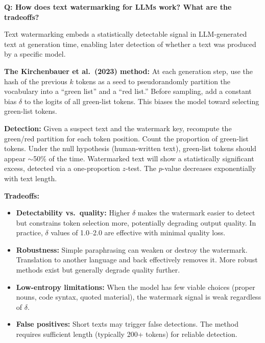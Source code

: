 \begin{interviewq}
\textbf{Q: How does text watermarking for LLMs work? What are the tradeoffs?}

 \quad {} \quad \badgefreq{\freqlow}

\stronganswer
Text watermarking embeds a statistically detectable signal in LLM-generated
text at generation time, enabling later detection of whether a text was
produced by a specific model.

\textbf{The Kirchenbauer et al.\ (2023) method:}  At each generation step,
use the hash of the previous $k$ tokens as a seed to pseudorandomly partition
the vocabulary into a ``green list'' and a ``red list.''  Before sampling,
add a constant bias $\delta$ to the logits of all green-list tokens.  This
biases the model toward selecting green-list tokens.

\textbf{Detection:}  Given a suspect text and the watermark key, recompute
the green/red partition for each token position.  Count the proportion of
green-list tokens.  Under the null hypothesis (human-written text), green-list
tokens should appear $\sim$50\% of the time.  Watermarked text will show a
statistically significant excess, detected via a one-proportion $z$-test.
The $p$-value decreases exponentially with text length.

\textbf{Tradeoffs:}
\begin{itemize}
    \item \textbf{Detectability vs.\ quality:} Higher $\delta$ makes the
    watermark easier to detect but constrains token selection more, potentially
    degrading output quality.  In practice, $\delta$ values of 1.0--2.0 are
    effective with minimal quality loss.
    \item \textbf{Robustness:} Simple paraphrasing can weaken or destroy the
    watermark.  Translation to another language and back effectively removes
    it.  More robust methods exist but generally degrade quality further.
    \item \textbf{Low-entropy limitations:} When the model has few viable
    choices (proper nouns, code syntax, quoted material), the watermark signal
    is weak regardless of $\delta$.
    \item \textbf{False positives:} Short texts may trigger false detections.
    The method requires sufficient length (typically 200+ tokens) for reliable
    detection.
\end{itemize}


\end{interviewq}

